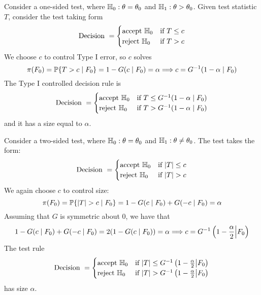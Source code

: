 \documentclass[10pt]{article}
\begin{document}
\begin{example}
	Consider a one-sided test, where $\mathbb{H}_0: \theta = \theta_0$ and $\mathbb{H}_1 : \theta > \theta_0$. Given test statistic $T$, consider the test taking form 
	\[
	\text{Decision } = \begin{cases} \text{accept } \mathbb{H}_0 & \text{if } T \le c \\ \text{reject } \mathbb{H}_0 & \text{if } T > c \end{cases}
	\]
	We choose $c$ to control Type I error, so $c$ solves
	\[
	\pi(F_0) = \mathbb{P}\{T > c \mid F_0\} = 1 - G(c\mid F_0) = \alpha \Longrightarrow c = G^{-1}(1-\alpha \mid F_0)
	\]
	The Type I controlled decision rule is
	\[
	\text{Decision } = \begin{cases} \text{accept } \mathbb{H}_0 & \text{if } T \le G^{-1}(1-\alpha \mid F_0) \\ \text{reject } \mathbb{H}_0 & \text{if } T > G^{-1}(1-\alpha \mid F_0) \end{cases}
	\]
	and it has a size equal to $\alpha$.
\end{example}

\begin{example}
	Consider a two-sided test, where $\mathbb{H}_0 : \theta = \theta_0$ and $\mathbb{H}_1 : \theta \ne \theta_0$. The test takes the form:
	\[
	\text{Decision } = \begin{cases} \text{accept } \mathbb{H}_0 & \text{if } |T| \le c \\ \text{reject } \mathbb{H}_0 & \text{if } |T| > c \end{cases}
	\]
	We again choose $c$ to control size:
	\[
	\pi(F_0) = \mathbb{P}\{|T| > c \mid F_0\} = 1 - G(c \mid F_0) + G(-c \mid F_0) = \alpha
	\]
	Assuming that $G$ is symmetric about 0, we have that 
	\[
	1 - G(c \mid F_0) + G(-c \mid F_0) = 2(1 - G(c \mid F_0))=  \alpha \Longrightarrow c = G^{-1}\left( 1 - \frac{\alpha}{2} \middle| F_0 \right)
	\]
	The test rule
	\[
	\text{Decision } = \begin{cases} \text{accept } \mathbb{H}_0 & \text{if } |T| \le G^{-1}\left( 1 - \frac{\alpha}{2} \middle| F_0 \right) \\ \text{reject } \mathbb{H}_0 & \text{if } |T| > G^{-1}\left( 1 - \frac{\alpha}{2} \middle| F_0 \right) \end{cases}
	\]
	has size $\alpha$.
\end{example}
\end{document}
